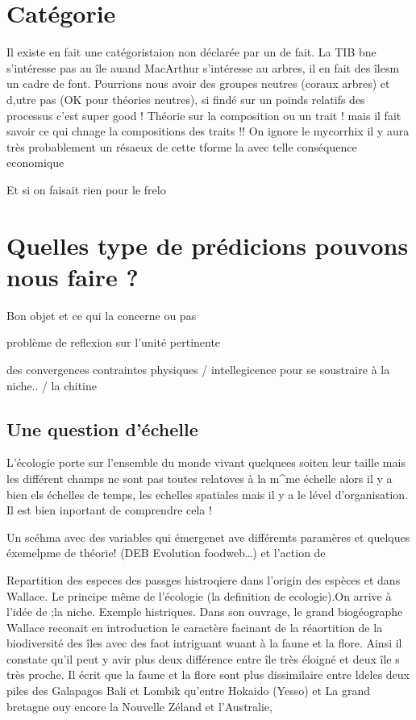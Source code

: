 \section{Catégorie}\label{catuxe9gorie}

Il existe en fait une catégoristaion non déclarée par un de fait. La TIB
bne s'intéresse pas au île auand MacArthur s'intéresse au arbres, il en
fait des îlesm un cadre de font. Pourrions nous avoir des groupes
neutres (coraux arbres) et d,utre pas (OK pour théories neutres), si
findé sur un poinds relatifs des processus c'est super good ! Théorie
sur la composition ou un trait ! mais il fait savoir ce qui chnage la
compositions des traits !! On ignore le mycorrhix il y aura très
probablement un résaeux de cette tforme la avec telle conséquence
economique

Et si on faisait rien pour le frelo

\section{Quelles type de prédicions pouvons nous faire
?}\label{quelles-type-de-pruxe9dicions-pouvons-nous-faire}

Bon objet et ce qui la concerne ou pas

problème de reflexion sur l'unité pertinente

des convergences contraintes physiques / intellegicence pour se
soustraire à la niche.. / la chitine

\subsection{Une question d'échelle}\label{une-question-duxe9chelle}

L'écologie porte sur l'ensemble du monde vivant quelquees soiten leur
taille mais les différent champs ne sont pas toutes relatoves à la
m\^{}me échelle alors il y a bien els échelles de temps, les echelles
spatiales mais il y a le lével d'organisation. Il est bien inportant de
comprendre cela !

Un scéhma avec des variables qui émergenet ave différemts paramères et
quelques éxemelpme de théorie! (DEB Evolution foodweb\ldots{}) et
l'action de

Repartition des especes des passges histroqiere dans l'origin des
espèces et dans Wallace. Le principe même de l'écologie (la definition
de ecologie).On arrive à l'idée de ;la niche. Exemple histriques. Dans
son ouvrage, le grand biogéographe Wallace reconait en introduction le
caractère facinant de la réaortition de la biodiversité des îles avec
des faot intriguant wuant à la faune et la flore. Ainsi il constate
qu'il peut y avir plus deux différence entre île très éloigné et deux
île s très proche. Il écrit que la faune et la flore sont plus
dissimilaire entre ldeles deux piles des Galapagos Bali et Lombik
qu'entre Hokaido (Yesso) et La grand bretagne ouy encore la Nouvelle
Zéland et l'Australie,

